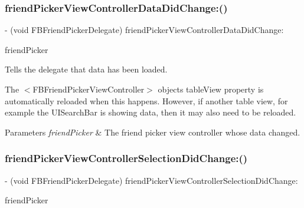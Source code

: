 \subsubsection{\texorpdfstring{friend\+Picker\+View\+Controller\+Data\+Did\+Change\+:()}{friendPickerViewControllerDataDidChange:()}\hspace{0.1cm}{\footnotesize\ttfamily [5/5]}}
{\footnotesize\ttfamily -\/ (void F\+B\+Friend\+Picker\+Delegate) friend\+Picker\+View\+Controller\+Data\+Did\+Change\+: \begin{DoxyParamCaption}\item[{(\hyperlink{interfaceFBFriendPickerViewController}{F\+B\+Friend\+Picker\+View\+Controller} $\ast$)}]{friend\+Picker }\end{DoxyParamCaption}\hspace{0.3cm}{\ttfamily [optional]}}

Tells the delegate that data has been loaded.

The $<$\+F\+B\+Friend\+Picker\+View\+Controller$>$ object\textquotesingle{}s {\ttfamily table\+View} property is automatically reloaded when this happens. However, if another table view, for example the {\ttfamily U\+I\+Search\+Bar} is showing data, then it may also need to be reloaded.


\begin{DoxyParams}{Parameters}
{\em friend\+Picker} & The friend picker view controller whose data changed. \\
\hline
\end{DoxyParams}
\mbox{\label{protocolFBFriendPickerDelegate_01-p_a6b00500fbc7158e7b0b0155b44cd02f5}} 
\subsubsection{\texorpdfstring{friend\+Picker\+View\+Controller\+Selection\+Did\+Change\+:()}{friendPickerViewControllerSelectionDidChange:()}\hspace{0.1cm}{\footnotesize\ttfamily [1/5]}}
{\footnotesize\ttfamily -\/ (void F\+B\+Friend\+Picker\+Delegate) friend\+Picker\+View\+Controller\+Selection\+Did\+Change\+: \begin{DoxyParamCaption}\item[{(\hyperlink{interfaceFBFriendPickerViewController}{F\+B\+Friend\+Picker\+View\+Controller} $\ast$)}]{friend\+Picker }\end{DoxyParamCaption}\hspace{0.3cm}{\ttfamily [optional]}}

